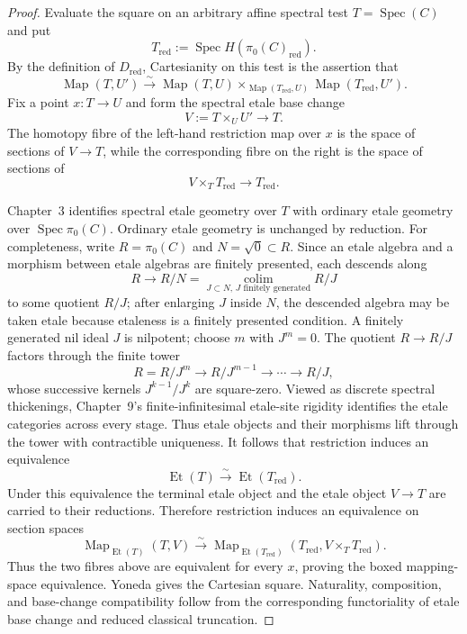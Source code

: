 \begin{proof}
Evaluate the square on an arbitrary affine spectral test
$T=\operatorname{Spec}(C)$ and put
\[
    T_{\mathrm{red}}
    :=
    \operatorname{Spec}H(\pi_0(C)_{\mathrm{red}}).
\]
By the definition of $D_{\mathrm{red}}$, Cartesianity on this test is the
assertion that
\[
\boxed{
    \operatorname{Map}(T,U')
    \xrightarrow{\sim}
    \operatorname{Map}(T,U)
    \times_{\operatorname{Map}(T_{\mathrm{red}},U)}
    \operatorname{Map}(T_{\mathrm{red}},U').}
\]
Fix a point $x:T\to U$ and form the spectral etale base change
\[
    V:=T\times_UU'\longrightarrow T.
\]
The homotopy fibre of the left-hand restriction map over $x$ is the space of
sections of $V\to T$, while the corresponding fibre on the right is the
space of sections of
\[
    V\times_TT_{\mathrm{red}}
    \longrightarrow
    T_{\mathrm{red}}.
\]

Chapter~3 identifies spectral etale geometry over $T$ with ordinary etale
geometry over $\operatorname{Spec}\pi_0(C)$.  Ordinary etale geometry is
unchanged by reduction.  For completeness, write
$R=\pi_0(C)$ and $N=\sqrt{0}\subset R$.  Since an etale algebra and a
morphism between etale algebras are finitely presented, each descends along
\[
    R\longrightarrow R/N
    =\operatorname*{colim}_{J\subset N,\,J\text{ finitely generated}}R/J
\]
to some quotient $R/J$; after enlarging $J$ inside $N$, the descended
algebra may be taken etale because etaleness is a finitely presented
condition.  A finitely generated nil ideal $J$ is nilpotent; choose $m$ with
$J^m=0$.  The quotient $R\to R/J$ factors through the finite tower
\[
    R=R/J^m\longrightarrow R/J^{m-1}\longrightarrow\cdots\longrightarrow
    R/J,
\]
whose successive kernels $J^{k-1}/J^k$ are square-zero.  Viewed as discrete
spectral thickenings, Chapter~9's finite-infinitesimal etale-site rigidity
identifies the etale categories across every stage.  Thus etale objects and
their morphisms lift through the tower with contractible uniqueness.  It
follows that restriction induces an equivalence
\[
    \operatorname{Et}(T)
    \xrightarrow{\sim}
    \operatorname{Et}(T_{\mathrm{red}}).
\]
Under this equivalence the terminal etale object and the etale object
$V\to T$ are carried to their reductions.  Therefore restriction induces an
equivalence on section spaces
\[
    \operatorname{Map}_{\operatorname{Et}(T)}(T,V)
    \xrightarrow{\sim}
    \operatorname{Map}_{\operatorname{Et}(T_{\mathrm{red}})}
    \left(
        T_{\mathrm{red}},
        V\times_TT_{\mathrm{red}}
    \right).
\]
Thus the two fibres above are equivalent for every $x$, proving the boxed
mapping-space equivalence.  Yoneda gives the Cartesian square.  Naturality,
composition, and base-change compatibility follow from the corresponding
functoriality of etale base change and reduced classical truncation.
\end{proof}

